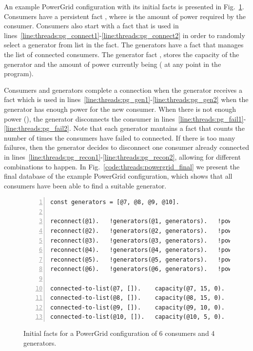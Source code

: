 An example PowerGrid configuration with its initial facts is presented in
Fig.~\ref{code:threads:powergrid_init}. Consumers have a persistent fact
, where  is the amount of power required by the
consumer. Consumers also start with a
 fact that is used in
lines~\ref{line:threads:pg_connect1}-\ref{line:threads:pg_connect2} in order to
randomly select a generator from list  in the 
fact. The generators have a  fact that manages the
list of connected consumers. The generator fact ,
stores the  capacity of the generator and the amount of power
currently being  ( at any point in the program).

Consumers and generators complete a connection when the generator receives a
 fact which is used in
lines~\ref{line:threads:pg_gen1}-\ref{line:threads:pg_gen2} when the generator
has enough power for the new consumer. When there is not enough power
(), the generator disconnects the consumer in
lines~\ref{line:threads:pg_fail1}-\ref{line:threads:pg_fail2}. Note that each
generator mantains a  fact that counts the number of times the
consumers have failed to connected. If there is too many failures, then the
generator decides to disconnect one consumer already connected in
lines~\ref{line:threads:pg_recon1}-\ref{line:threads:pg_recon2}, allowing for
different combinations to happen. In Fig.~\ref{code:threads:powergrid_final} we
present the final database of the example PowerGrid configuration, which shows
that all consumers have been able to find a suitable generator.

\begin{figure}[h!]
\begin{Verbatim}[numbers=left,fontsize=\codesize,commandchars=*\#\&]
const generators = [@7, @8, @9, @10].

reconnect(@1).   !generators(@1, generators).   !power(@1, 5).
reconnect(@2).   !generators(@2, generators).   !power(@2, 10).
reconnect(@3).   !generators(@3, generators).   !power(@3, 5).
reconnect(@4).   !generators(@4, generators).   !power(@4, 10).
reconnect(@5).   !generators(@5, generators).   !power(@5, 10).
reconnect(@6).   !generators(@6, generators).   !power(@6, 5).

connected-to-list(@7, []).    capacity(@7, 15, 0).   fail(@7, 0).
connected-to-list(@8, []).    capacity(@8, 15, 0).   fail(@8, 0).
connected-to-list(@9, []).    capacity(@9, 10, 0).   fail(@9, 0).
connected-to-list(@10, []).   capacity(@10, 5, 0).   fail(@10, 0).
\end{Verbatim}
\caption{Initial facts for a PowerGrid configuration of 6 consumers and 4 generators.}
\label{code:threads:powergrid_init}
\end{figure}

